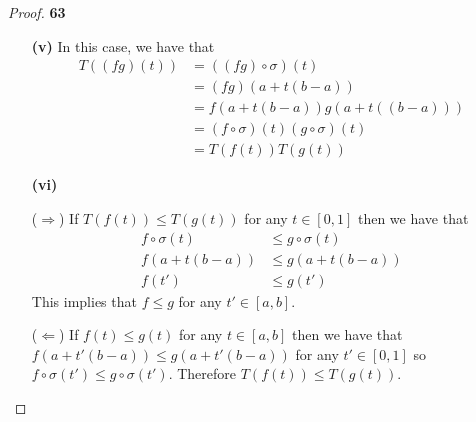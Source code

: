 \documentclass[11pt]{article}
\theoremstyle{definition}
\begin{document}
\begin{proof}{\textbf{63}}
\begin{itemize}
            \item [\textbf{(v)}] In this case, we have that
            \begin{align*}
                T((fg)(t)) &= ((fg) \circ \sigma)(t)\\
                    &= (f g) (a + t(b-a))\\
                    &= f(a + t(b-a))g(a + t((b-a)))\\ 
                    &= (f\circ\sigma)(t)(g\circ\sigma)(t)\\
                    &= T(f(t))T(g(t))
            \end{align*}
            \item [\textbf{(vi)}]

            ($\Rightarrow$) If $T(f(t)) \leq T(g(t))$ for any $t \in [0,1]$
            then we have that
            \begin{align*}
                f\circ\sigma(t) &\leq g\circ\sigma(t)\\
                f(a + t(b-a)) &\leq g(a + t(b-a))\\
                f(t') &\leq g(t')
            \end{align*}
            This implies that $f \leq g$ for any $t' \in [a,b]$.

            ($\Leftarrow$) If $f(t) \leq g(t)$ for any $t \in [a,b]$ then we
            have that $f(a + t'(b-a)) \leq g(a + t'(b-a))$ for any
            $t' \in [0,1]$ so $f \circ\sigma(t') \leq g\circ\sigma(t')$.
            Therefore $T(f(t)) \leq T(g(t))$.
        \end{itemize}
    \end{proof}
\cleardoublepage
\end{document}
